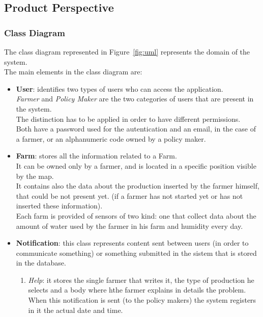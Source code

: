 \subsection{Product Perspective}
\subsubsection{Class Diagram}
The class diagram represented in Figure~\ref{fig:uml} represents the domain of the system. \\
The main elements in the class diagram are:
\begin{itemize}
    \item \textbf{User}: identifies two types of users who can access the application.\\
    \textsl{Farmer} and \textsl{Policy Maker} are the two categories of users that are present in the system. \\
    The distinction has to be applied in order to have different permissions.\\
    Both have a password used for the autentication and an email, in the case of a farmer, or an alphanumeric code owned by a policy maker.
    \item \textbf{Farm}: stores all the information related to a Farm.\\ 
    It can be owned only by a farmer, and is located in a specific position visible by the map. \\
    It contains also the data about the production inserted by the farmer himself, that could be not present yet.
    (if a farmer has not started yet or has not inserted these information).\\
    Each farm is provided of sensors of two kind: one that collect data about the amount of water used by the farmer in his farm and humidity every day.\\
    \item \textbf{Notification}: this class represents content sent between users (in order to communicate something) or something submitted in the sistem that is stored in the database.\\
        \begin{enumerate}
            \item \textsl{Help}: it stores the single farmer that writes it, 
            the type of production he selects and a body where hthe farmer explains in details the problem.\\
            When this notification is sent (to the policy makers) the system registers in it the actual date and time.

\end{enumerate}
\end{itemize}
